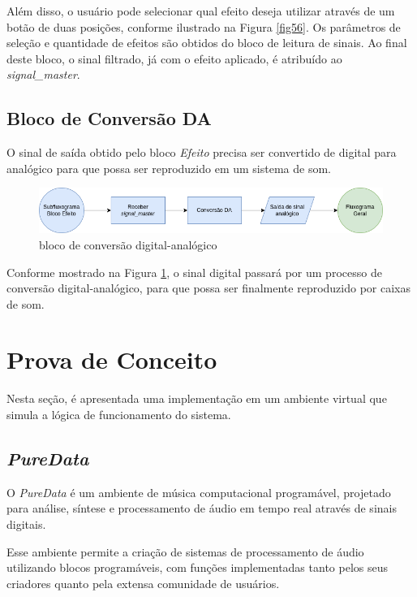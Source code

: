 Além disso, o usuário pode selecionar qual efeito deseja utilizar através de um botão de duas posições, conforme ilustrado na Figura \ref{fig56}. Os parâmetros de seleção e quantidade de efeitos são obtidos do bloco de leitura de sinais. Ao final deste bloco, o sinal filtrado, já com o efeito aplicado, é atribuído ao \textit{signal\_master}.

\subsection{Bloco de Conversão DA}

O sinal de saída obtido pelo bloco \textit{Efeito} precisa ser convertido de digital para analógico para que possa ser reproduzido em um sistema de som.

\begin{figure}[h]
    \centering
    \includegraphics[width=\textwidth]{figuras/fig59.png}
    \caption{bloco de conversão digital-analógico}
    \label{fig59}
\end{figure}

Conforme mostrado na Figura \ref{fig59}, o sinal digital passará por um processo de conversão digital-analógico, para que possa ser finalmente reproduzido por caixas de som.

\newpage
\section{Prova de Conceito}

Nesta seção, é apresentada uma implementação em um ambiente virtual que simula a lógica de funcionamento do sistema.

\subsection{\textit{PureData}}

O \textit{PureData} \cite{puredata} é um ambiente de música computacional programável, projetado para análise, síntese e processamento de áudio em tempo real através de sinais digitais.

Esse ambiente permite a criação de sistemas de processamento de áudio utilizando blocos programáveis, com funções implementadas tanto pelos seus criadores quanto pela extensa comunidade de usuários.

